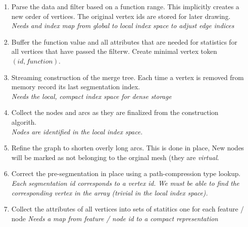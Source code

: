 \documentclass[]{article}
\begin{document}
\begin{enumerate}
\item Parse the data and filter based on a function range. This implicitly
  creates a new order of vertices. The original vertex ids are stored for later
  drawing.\\
  {\it Needs and index map from global to local index space to adjust edge
    indices}
\item Buffer the function value and all attributes that are needed for
  statistics for all vertices that have passed the filterw. Create minimal vertex
  token $(id,function)$.
\item Streaming construction of the merge tree. Each time a vertex is removed
  from memory record its last segmentation index.\\
  {\it Needs the local, compact index space for dense storage}
\item Collect the nodes and arcs as they are finalized from the construction
  algorith.\\
  {\it Nodes are identified in the local index space.}
\item Refine the graph to shorten overly long arcs. This is done in place, New
  nodes will be marked as not belonging to the orginal mesh (they are {\it
    virtual}.
\item Correct the pre-segmentation in place using a path-compression type
  lookup. \\
  {\it Each segmentation id corresponds to a vertex id. We must be able to find
    the corresponding vertex in the array (trivial in the local index space).}
\item Collect the attributes of all vertices into sets of statitics one for each
  feature / node
{\it Needs a map from feature / node id to a compact representation}
\end{enumerate}
\end{document}

